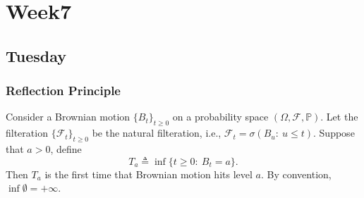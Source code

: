 
\chapter{Week7}

\section{Tuesday}

\subsection{Reflection Principle}

Consider a Brownian motion $\{B_t\}_{t\ge0}$ on a probability space $(\Omega,\mathcal{F},\mathbb{P})$.
Let the filteration $\{\mathcal{F}_t\}_{t\ge0}$ be the natural filteration, i.e., 
$\mathcal{F}_t=\sigma(B_u:~u\le t)$. Suppose that $a>0$, define
\[
T_a\triangleq \inf\{t\ge0:~B_t=a\}.
\]
Then $T_a$ is the first time that Brownian motion hits level $a$.
By convention, $\inf\emptyset=+\infty$.

